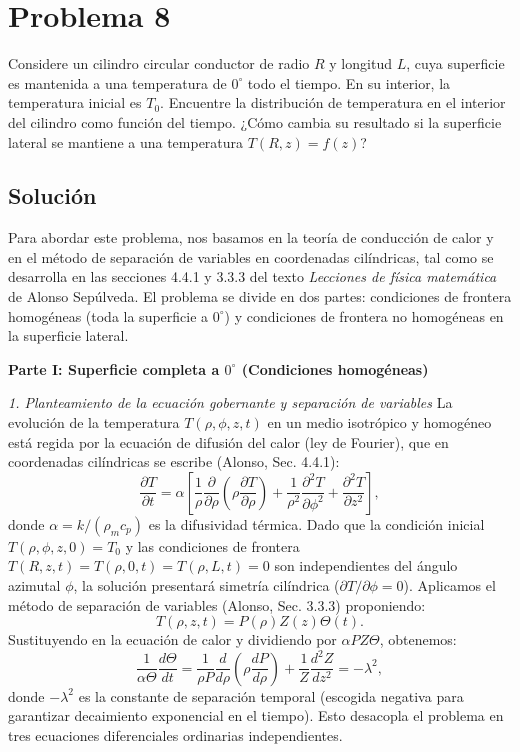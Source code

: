 \documentclass[a4paper]{article}
\begin{document}
\section{Problema 8}
Considere un cilindro circular conductor de radio $R$ y longitud $L$, cuya superficie es mantenida a una temperatura de $0^\circ$ todo el tiempo. En su interior, la temperatura inicial es $T_0$. Encuentre la distribución de temperatura en el interior del cilindro como función del tiempo. ¿Cómo cambia su resultado si la superficie lateral se mantiene a una temperatura $T(R, z)= f(z)$?

\subsection{Solución}
Para abordar este problema, nos basamos en la teoría de conducción de calor y en el método de separación de variables en coordenadas cilíndricas, tal como se desarrolla en las secciones 4.4.1 y 3.3.3 del texto \textit{Lecciones de física matemática} de Alonso Sepúlveda. El problema se divide en dos partes: condiciones de frontera homogéneas (toda la superficie a $0^\circ$) y condiciones de frontera no homogéneas en la superficie lateral.

\textbf{Parte I: Superficie completa a $0^\circ$ (Condiciones homogéneas)}

\textit{1. Planteamiento de la ecuación gobernante y separación de variables}
La evolución de la temperatura $T(\rho, \phi, z, t)$ en un medio isotrópico y homogéneo está regida por la ecuación de difusión del calor (ley de Fourier), que en coordenadas cilíndricas se escribe (Alonso, Sec. 4.4.1):
$$\frac{\partial T}{\partial t} = \alpha \left[ \frac{1}{\rho} \frac{\partial}{\partial \rho} \left( \rho \frac{\partial T}{\partial \rho} \right) + \frac{1}{\rho^2} \frac{\partial^2 T}{\partial \phi^2} + \frac{\partial^2 T}{\partial z^2} \right],$$
donde $\alpha = k/(\rho_m c_p)$ es la difusividad térmica. Dado que la condición inicial $T(\rho, \phi, z, 0) = T_0$ y las condiciones de frontera $T(R, z, t) = T(\rho, 0, t) = T(\rho, L, t) = 0$ son independientes del ángulo azimutal $\phi$, la solución presentará simetría cilíndrica ($\partial T/\partial \phi = 0$). Aplicamos el método de separación de variables (Alonso, Sec. 3.3.3) proponiendo:
$$T(\rho, z, t) = P(\rho) Z(z) \Theta(t).$$
Sustituyendo en la ecuación de calor y dividiendo por $\alpha P Z \Theta$, obtenemos:
$$\frac{1}{\alpha \Theta} \frac{d\Theta}{dt} = \frac{1}{\rho P} \frac{d}{d\rho} \left( \rho \frac{dP}{d\rho} \right) + \frac{1}{Z} \frac{d^2 Z}{dz^2} = -\lambda^2,$$
donde $-\lambda^2$ es la constante de separación temporal (escogida negativa para garantizar decaimiento exponencial en el tiempo). Esto desacopla el problema en tres ecuaciones diferenciales ordinarias independientes.
\end{document}
